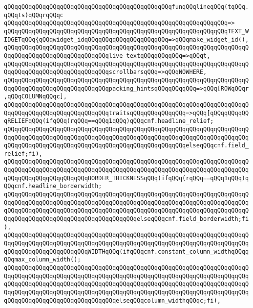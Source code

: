 \verb|qQQqqQQqqQQqqQQqqQQqqQQqqQQqqQQqqQQqqQQqqQQqqQQqfunqQQqlineqQQq(tqQQq.qQQqts)qQQqrqQQqc|\newline
\verb|qQQqqQQqqQQqqQQqqQQqqQQqqQQqqQQqqQQqqQQqqQQqqQQqqQQqqQQqqQQqqQQq=>|\newline
\verb|qQQqqQQqqQQqqQQqqQQqqQQqqQQqqQQqqQQqqQQqqQQqqQQqqQQqqQQqqQQqqQQqTEXT_WIDGETqQQq{qQQqwidget_idqQQqqQQqqQQqqQQqqQQqqQQq=>qQQqmake_widget_id(),|\newline
\verb|qQQqqQQqqQQqqQQqqQQqqQQqqQQqqQQqqQQqqQQqqQQqqQQqqQQqqQQqqQQqqQQqqQQqqQQqqQQqqQQqqQQqqQQqqQQqqQQqqQQqlive_textqQQqqQQqqQQq=>qQQqt,|\newline
\verb|qQQqqQQqqQQqqQQqqQQqqQQqqQQqqQQqqQQqqQQqqQQqqQQqqQQqqQQqqQQqqQQqqQQqqQQqqQQqqQQqqQQqqQQqqQQqqQQqqQQqscrollbarsqQQq=>qQQqNOWHERE,|\newline
\verb|qQQqqQQqqQQqqQQqqQQqqQQqqQQqqQQqqQQqqQQqqQQqqQQqqQQqqQQqqQQqqQQqqQQqqQQqqQQqqQQqqQQqqQQqqQQqqQQqqQQqpacking_hintsqQQqqQQqqQQq=>qQQq[ROWqQQqr,qQQqCOLUMNqQQqc],|\newline
\verb|qQQqqQQqqQQqqQQqqQQqqQQqqQQqqQQqqQQqqQQqqQQqqQQqqQQqqQQqqQQqqQQqqQQqqQQqqQQqqQQqqQQqqQQqqQQqqQQqqQQqtraitsqQQqqQQqqQQqqQQq=>qQQq[qQQqqQQqqQQqRELIEFqQQq(ifqQQq(rqQQq==qQQq1qQQq)qQQqcnf.headline_relief;|\newline
\verb|qQQqqQQqqQQqqQQqqQQqqQQqqQQqqQQqqQQqqQQqqQQqqQQqqQQqqQQqqQQqqQQqqQQqqQQqqQQqqQQqqQQqqQQqqQQqqQQqqQQqqQQqqQQqqQQqqQQqqQQqqQQqqQQqqQQqqQQqqQQqqQQqqQQqqQQqqQQqqQQqqQQqqQQqqQQqqQQqqQQqqQQqqQQqqQQqelseqQQqcnf.field_relief;fi),|\newline
\verb|qQQqqQQqqQQqqQQqqQQqqQQqqQQqqQQqqQQqqQQqqQQqqQQqqQQqqQQqqQQqqQQqqQQqqQQqqQQqqQQqqQQqqQQqqQQqqQQqqQQqqQQqqQQqqQQqqQQqqQQqqQQqqQQqqQQqqQQqqQQqqQQqqQQqqQQqqQQqqQQqqQQqBORDER_THICKNESSqQQq(ifqQQq(rqQQq==qQQq1qQQq)qQQqcnf.headline_borderwidth;|\newline
\verb|qQQqqQQqqQQqqQQqqQQqqQQqqQQqqQQqqQQqqQQqqQQqqQQqqQQqqQQqqQQqqQQqqQQqqQQqqQQqqQQqqQQqqQQqqQQqqQQqqQQqqQQqqQQqqQQqqQQqqQQqqQQqqQQqqQQqqQQqqQQqqQQqqQQqqQQqqQQqqQQqqQQqqQQqqQQqqQQqqQQqqQQqqQQqqQQqqQQqqQQqqQQqqQQqqQQqqQQqqQQqqQQqqQQqqQQqqQQqqQQqqQQqqQQqelseqQQqcnf.field_borderwidth;fi),|\newline
\verb|qQQqqQQqqQQqqQQqqQQqqQQqqQQqqQQqqQQqqQQqqQQqqQQqqQQqqQQqqQQqqQQqqQQqqQQqqQQqqQQqqQQqqQQqqQQqqQQqqQQqqQQqqQQqqQQqqQQqqQQqqQQqqQQqqQQqqQQqqQQqqQQqqQQqqQQqqQQqqQQqqQQqWIDTHqQQq(ifqQQqcnf.constant_column_widthqQQqqQQqmax_column_width();|\newline
\verb|qQQqqQQqqQQqqQQqqQQqqQQqqQQqqQQqqQQqqQQqqQQqqQQqqQQqqQQqqQQqqQQqqQQqqQQqqQQqqQQqqQQqqQQqqQQqqQQqqQQqqQQqqQQqqQQqqQQqqQQqqQQqqQQqqQQqqQQqqQQqqQQqqQQqqQQqqQQqqQQqqQQqqQQqqQQqqQQqqQQqqQQqqQQqqQQqqQQqqQQqqQQqqQQqqQQqqQQqqQQqqQQqqQQqqQQqqQQqqQQqqQQqqQQqqQQqqQQqqQQqqQQqqQQqqQQqqQQqqQQqqQQqqQQqqQQqqQQqqQQqqQQqqQQqqQQqelseqQQqcolumn_widthqQQqc;fi),|\newline
